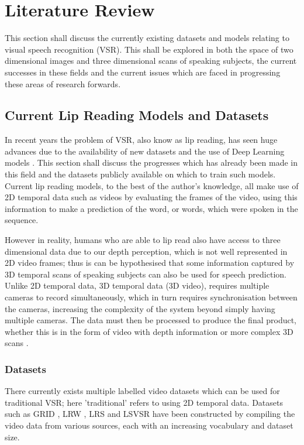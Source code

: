 %
%
%
%
%

\chapter{Literature Review}


This section shall discuss the currently existing datasets and models relating to visual speech recognition (VSR).
This shall be explored in both the space of two dimensional images and three dimensional scans of speaking subjects, the current successes in these fields and the current issues which are faced in progressing these areas of research forwards.

\section{Current Lip Reading Models and Datasets}

In recent years the problem of VSR, also know as lip reading, has seen huge advances due to the availability of new datasets and the use of Deep Learning models \cite{Chung2016, Chung2017, Shillingford2018}.
This section shall discuss the progresses which has already been made in this field and the datasets publicly available on which to train such models.
Current lip reading models, to the best of the author's knowledge, all make use of 2D temporal data such as videos by evaluating the frames of the video, using this information to make a prediction of the word, or words, which were spoken in the sequence.

However in reality, humans who are able to lip read also have access to three dimensional data due to our depth perception, which is not well represented in 2D video frames; thus is can be hypothesised that some information captured by 3D temporal scans of speaking subjects can also be used for speech prediction.
Unlike 2D temporal data, 3D temporal data (3D video), requires multiple cameras to record simultaneously, which in turn requires synchronisation between the cameras, increasing the complexity of the system beyond simply having multiple cameras.
The data must then be processed to produce the final product, whether this is in the form of video with depth information or more complex 3D scans \cite{Li2017}.

\subsection{Datasets}
There currently exists multiple labelled video datasets which can be used for traditional VSR; here 'traditional' refers to using 2D temporal data.
Datasets such as GRID \cite{Cooke2006}, LRW \cite{Chung2016}, LRS \cite{Chung2017} and LSVSR \cite{Shillingford2018} have been constructed by compiling the video data from various sources, each with an increasing vocabulary and dataset size.

